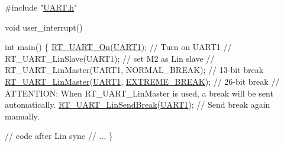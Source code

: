 \begin{DoxyCode}
\textcolor{preprocessor}{#include "\mbox{\hyperlink{a00056}{UART.h}}"}

\textcolor{keywordtype}{void} user\_interrupt()

int main() \{
    \mbox{\hyperlink{a00056_a7c1428a7b16eec7fe710679dd70b4069}{RT\_UART\_On}}(\mbox{\hyperlink{a00056_a8d69bf04d07af4fbbab5a8bd291f65ff}{UART1}});                          \textcolor{comment}{// Turn on UART1}
    \textcolor{comment}{// RT\_UART\_LinSlave(UART1);                 // set M2 as Lin slave}
    \textcolor{comment}{// RT\_UART\_LinMaster(UART1, NORMAL\_BREAK);  // 13-bit break}
    \mbox{\hyperlink{a00056_ab0faf051e642e540b1b9c114eae242bd}{RT\_UART\_LinMaster}}(\mbox{\hyperlink{a00056_a8d69bf04d07af4fbbab5a8bd291f65ff}{UART1}}, \mbox{\hyperlink{a00056_a7c76b3ed72795f2085873ee332fdab1b}{EXTREME\_BREAK}});    \textcolor{comment}{// 26-bit break}
    \textcolor{comment}{// ATTENTION: When RT\_UART\_LinMaster is used, a break will be sent automatically.}
    \mbox{\hyperlink{a00056_ad1e6c13693e5ea54a55ce78635617178}{RT\_UART\_LinSendBreak}}(\mbox{\hyperlink{a00056_a8d69bf04d07af4fbbab5a8bd291f65ff}{UART1}});                \textcolor{comment}{// Send break again manually.}

    \textcolor{comment}{// code after Lin sync}
    \textcolor{comment}{// ...}
\}
\end{DoxyCode}
 